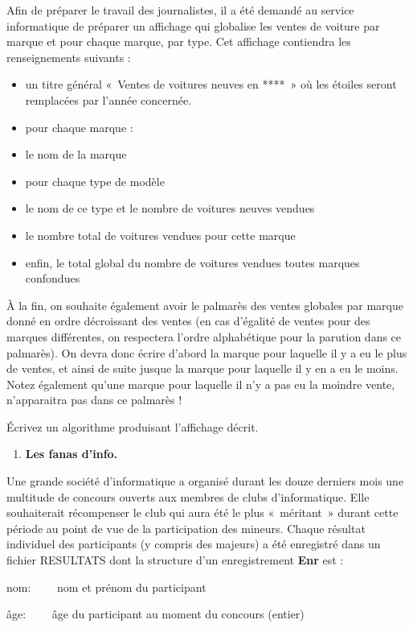 {
Afin de préparer le travail des journalistes, il a été demandé au
service informatique de préparer un affichage qui globalise les ventes
de voiture par marque et pour chaque marque, par type. Cet affichage
contiendra les renseignements suivants :}

\liststyleListv
\begin{itemize}
\item {
un titre général «~Ventes de voitures neuves en ****~» où les étoiles
seront remplacées par l’année concernée.}
\item {
pour chaque marque :}
\item {
le nom de la marque}
\item {
pour chaque type de modèle}
\item {
le nom de ce type et le nombre de voitures neuves vendues}
\item {
le nombre total de voitures vendues pour cette marque}
\item {
enfin, le total global du nombre de voitures vendues toutes marques
confondues}
\end{itemize}
{
À la fin, on souhaite également avoir le palmarès des ventes globales
par marque donné en ordre décroissant des ventes (en cas d’égalité de
ventes pour des marques différentes, on respectera l’ordre alphabétique
pour la parution dans ce palmarès). On devra donc écrire d’abord la
marque pour laquelle il y a eu le plus de ventes, et ainsi de suite
jusque la marque pour laquelle il y en a eu le moins. Notez également
qu’une marque pour laquelle il n’y a pas eu la moindre vente,
n’apparaitra pas dans ce palmarès !}

{
Écrivez un algorithme produisant l'affichage décrit.}

\liststyleExercice
\begin{enumerate}
\item {\sffamily\bfseries
Les fanas d'info.}
\end{enumerate}
{
Une grande société d’informatique a organisé durant les douze derniers
mois une multitude de concours ouverts aux membres de clubs
d’informatique. Elle souhaiterait récompenser le club qui aura été le
plus «~méritant~» durant cette période au point de vue de la
participation des mineurs. Chaque résultat individuel des participants
(y compris des majeurs) a été enregistré dans un fichier RESULTATS dont
la structure d’un enregistrement \textbf{Enr} est :}

{
nom: \ \ \ \ nom et prénom du participant}

{
âge: \ \ \ \ âge du participant au moment du concours (entier)}

